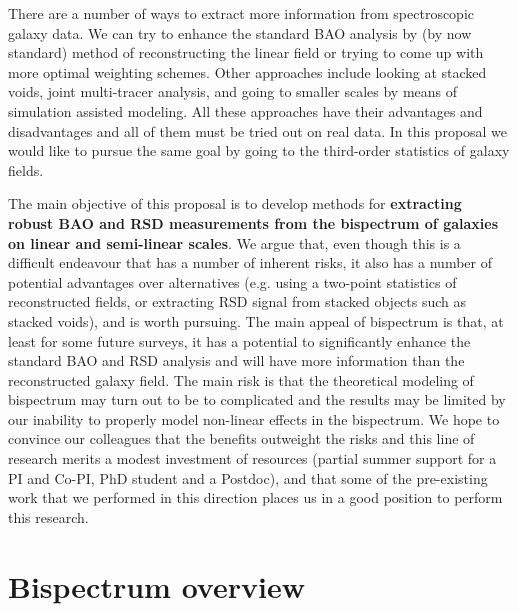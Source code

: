 There are a number of ways to extract more information from spectroscopic galaxy data. We can try to enhance the standard
BAO analysis by (by now standard) method of reconstructing the linear field or trying to come up with more optimal weighting
schemes. Other approaches include looking at stacked voids, joint multi-tracer analysis, and going to smaller scales by means
of simulation assisted modeling. All these approaches have their advantages and disadvantages and all of them must be tried out
on real data. In this proposal we would like to pursue the same goal by going to the third-order statistics of galaxy fields.

The main objective of this proposal is to develop methods for \textbf{extracting robust BAO and RSD measurements from the 
bispectrum of galaxies on linear and semi-linear scales}. We argue that, even though this is a difficult 
endeavour that has a number of inherent risks, it also has a number of potential advantages over alternatives (e.g.
using a two-point statistics of reconstructed fields, or extracting RSD signal from stacked objects such as stacked voids),
and is worth pursuing. The main appeal of bispectrum is that, at least for some future surveys, it has a potential
to significantly enhance the standard BAO and RSD analysis and will have more information than the reconstructed galaxy field.
The main risk is that the theoretical modeling of bispectrum may turn out to be to complicated and the results may be limited
by our inability to properly model non-linear effects in the bispectrum. We hope to convince our colleagues that the benefits 
outweight the risks and this line of research merits a modest investment of resources (partial summer support for a PI and Co-PI,
PhD student and a Postdoc), and that some of the pre-existing work that we performed in this direction places us in a good position 
to perform this research.

\section{Bispectrum overview}

